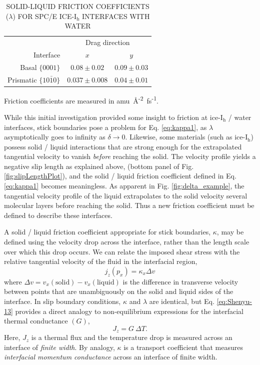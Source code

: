 \begin{table}[h]
\centering
\caption{SOLID-LIQUID FRICTION COEFFICIENTS ($\lambda$) FOR SPC/E
  ICE-I$_\mathrm{h}$ INTERFACES WITH WATER }
\label{tab:lambda}
\begin{tabular}{r|cc}  
\hline
\hline
           & \multicolumn{2}{c}{Drag direction} \\ 
 Interface & $x$               & $y$  \\ \hline
     Basal  $\{0001\}$ &  $0.08 \pm 0.02$  & $0.09 \pm 0.03$ \\
 Prismatic  $\{10\bar{1}0\}$ & $0.037 \pm 0.008$ & $0.04 \pm 0.01$ \\ 
\hline
\hline
\end{tabular}
\begin{flushleft}
  Friction coefficients are measured in
  amu~\AA\textsuperscript{-2}~fs\textsuperscript{-1}.
\end{flushleft}
\end{table}



While this initial investigation provided some insight to friction at
ice-I$_\mathrm{h}$ / water interfaces, stick boundaries pose a problem
for Eq.  \eqref{eq:kappa1}, as $\lambda$ asymptotically goes to
infinity as $\delta \rightarrow 0$.  Likewise, some materials (such as
ice-I$_\mathrm{h}$) possess solid / liquid interactions that are
strong enough for the extrapolated tangential velocity to vanish
\textit{before} reaching the solid. The velocity profile yields a
negative slip length as explained above, (bottom panel of Fig.
\ref{fig:slipLengthPlot}), and the solid / liquid friction coefficient
defined in Eq. \eqref{eq:kappa1} becomes meaningless.  As apparent in
Fig. \ref{fig:delta_example}, the tangential velocity profile of the
liquid extrapolates to the solid velocity several molecular layers
before reaching the solid. Thus a new friction coefficient must be
defined to describe these interfaces.

A solid / liquid friction coefficient appropriate for stick
boundaries, $\kappa$, may be defined using the velocity drop
across the interface, rather than the length scale over which this
drop occurs. We can relate the imposed shear stress with the relative
tangential velocity of the fluid in the interfacial
region,\cite{Kuang2012}
\begin{equation}\label{eq:Shenyu-13}
j_{z}(p_{x}) = \kappa_{x} \Delta v
\end{equation}
where $\Delta v = v_{x}(\mathrm{solid}) - v_{x}(\mathrm{liquid})$ is
the difference in transverse velocity between points that are
unambiguously on the solid and liquid sides of the interface.  In slip
boundary conditions, $\kappa$ and $\lambda$ are identical, but
Eq. \eqref{eq:Shenyu-13} provides a direct analogy to non-equilibrium
expressions for the interfacial thermal conductance $(G)$,
\begin{equation}
J_z = G~ \Delta T.
\end{equation}
Here, $J_z$ is a thermal flux and the temperature drop is measured
across an interface of \textit{finite width}. By analogy, $\kappa$ is
a transport coefficient that measures \textit{interfacial momentum
  conductance} across an interface of finite width.

